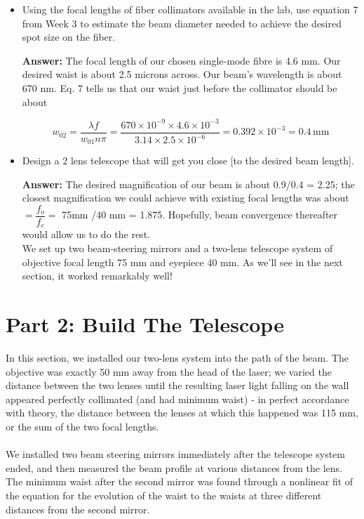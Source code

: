 \documentclass[10pt,a4paper]{article}
\begin{document}
\begin{itemize}
\item Using the focal lengths of fiber collimators available in the lab, use equation 7 from Week 3 to estimate the beam diameter needed to achieve the desired spot size on the fiber.

\textbf{Answer: }The focal length of our chosen single-mode fibre is 4.6 mm. Our desired waist is about 2.5 microns across. Our beam's wavelength is about 670 nm. Eq. 7 tells us that our waist just before the collimator should be about

$$w_{02} = \dfrac{\lambda f}{w_{01}n\pi} = \dfrac{670 \times 10^{-9} \times 4.6 \times 10^{-3}}{3.14 \times 2.5 \times 10^{-6}} = 0.392 \times 10^{-3} = 0.4 \,\mathrm{mm}$$

\item Design a 2 lens telescope that will get you close [to the desired beam length].

\textbf{Answer: }The desired magnification of our beam is about 0.9/0.4 = 2.25; the closest magnification we could achieve with existing focal lengths was about $ = \dfrac{f_{o}}{f_{e}} = $ 75mm /40 mm = 1.875. Hopefully, beam convergence thereafter would allow us to do the rest. \\

We set up two beam-steering mirrors and a two-lens telescope system of objective focal length 75 mm and eyepiece 40 mm. As we'll see in the next section, it worked remarkably well!
\end{itemize}
\section*{Part 2: Build The Telescope}
In this section, we installed our two-lens system into the path of the beam. The objective was exactly 50 mm away from the head of the laser; we varied the distance between the two lenses until the resulting laser light falling on the wall appeared perfectly collimated (and had minimum waist) - in perfect accordance with theory, the distance between the lenses at which this happened was 115 mm, or the sum of the two focal lengths. \\
\\
\noindent We installed two beam steering mirrors immediately after the telescope system ended, and then measured the beam profile at various distances from the lens. The minimum waist after the second mirror was found through a nonlinear fit of the equation for the evolution of the waist to the waists at three different distances from the second mirror. 
\end{document}
